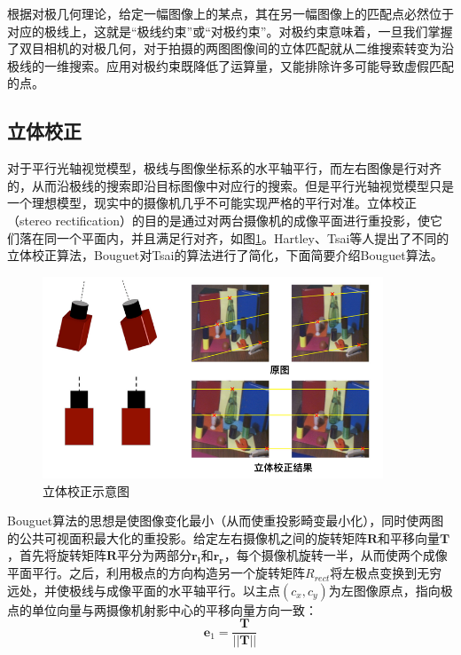 根据对极几何理论，给定一幅图像上的某点，其在另一幅图像上的匹配点必然位于对应的极线上，这就是“极线约束”或“对极约束”。对极约束意味着，一旦我们掌握了双目相机的对极几何，对于拍摄的两图图像间的立体匹配就从二维搜索转变为沿极线的一维搜索。应用对极约束既降低了运算量，又能排除许多可能导致虚假匹配的点。


\subsection{立体校正}
对于平行光轴视觉模型，极线与图像坐标系的水平轴平行，而左右图像是行对齐的，从而沿极线的搜索即沿目标图像中对应行的搜索。但是平行光轴视觉模型只是一个理想模型，现实中的摄像机几乎不可能实现严格的平行对准。立体校正（stereo rectification）的目的是通过对两台摄像机的成像平面进行重投影，使它们落在同一个平面内，并且满足行对齐，如图\ref{fig:2_3_stereo_rectification}。Hartley\cite{hartley1999theory}、Tsai\cite{tsai1987versatile}等人提出了不同的立体校正算法，Bouguet对Tsai的算法进行了简化，下面简要介绍Bouguet算法。

\begin{figure}[!htb] %
	\centering
	\includegraphics[width=4in]{figures/2_3_stereo_rectification}
	\caption{立体校正示意图}\label{fig:2_3_stereo_rectification}
\end{figure}

Bouguet算法的思想是使图像变化最小（从而使重投影畸变最小化），同时使两图的公共可视面积最大化的重投影\cite{bradski2008learning}。给定左右摄像机之间的旋转矩阵$\mathbf{R}$和平移向量$\mathbf{T}$，首先将旋转矩阵$\mathbf{R}$平分为两部分$\mathbf{r_l}$和$\mathbf{r_r}$，每个摄像机旋转一半，从而使两个成像平面平行。之后，利用极点的方向构造另一个旋转矩阵$R_{rect}$将左极点变换到无穷远处，并使极线与成像平面的水平轴平行。以主点$(c_x, c_y)$为左图像原点，指向极点的单位向量与两摄像机射影中心的平移向量方向一致：
%
\begin{equation}\label{eq:2_3_7}
\mathbf{e}_1 = \frac{\mathbf{T}}{||\mathbf{T}||}
\end{equation}

